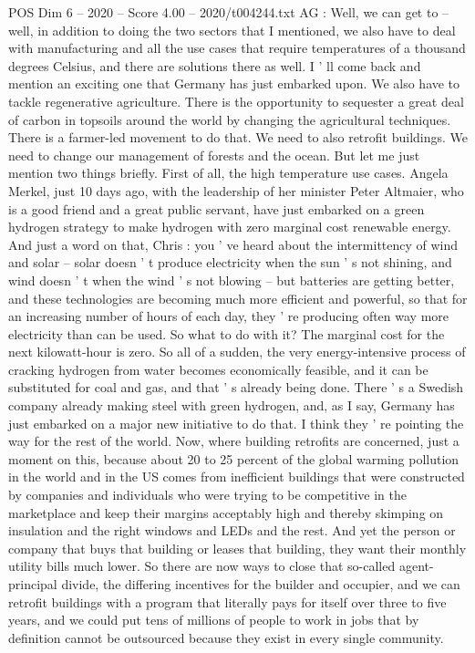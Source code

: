 \begin{textsample}{POS Dim 6 – 2020 – Score 4.00 – 2020/t004244.txt}
AG : Well, we can get to -- well, in addition to doing the two sectors that I mentioned, we also have to deal with manufacturing and all the use cases that require temperatures of a thousand degrees Celsius, and there are solutions there as well.
I ' ll come back and mention an exciting one that Germany has just embarked upon.
We also have to tackle regenerative agriculture.
There is the opportunity to sequester a great deal of carbon in topsoils around the world by changing the agricultural techniques.
There is a farmer-led movement to do that.
We need to also retrofit buildings.
We need to change our management of forests and the ocean.
But let me just mention two things briefly.
First of all, the high temperature use cases.
Angela Merkel, just 10 days ago, with the leadership of her minister Peter Altmaier, who is a good friend and a great public servant, have just embarked on a green hydrogen strategy to make hydrogen with zero marginal cost renewable energy.
And just a word on that, Chris : you ' ve heard about the intermittency of wind and solar -- solar doesn ' t produce electricity when the sun ' s not shining, and wind doesn ' t when the wind ' s not blowing -- but batteries are getting better, and these technologies are becoming much more efficient and powerful, so that for an increasing number of hours of each day, they ' re producing often way more electricity than can be used.
So what to do with it?
The marginal cost for the next kilowatt-hour is zero.
So all of a sudden, the very energy-intensive process of cracking hydrogen from water becomes economically feasible, and it can be substituted for coal and gas, and that ' s already being done.
There ' s a Swedish company already making steel with green hydrogen, and, as I say, Germany has just embarked on a major new initiative to do that.
I think they ' re pointing the way for the rest of the world.
Now, where building retrofits are concerned, just a moment on this, because about 20 to 25 percent of the global warming pollution in the world and in the US comes from inefficient buildings that were constructed by companies and individuals who were trying to be competitive in the marketplace and keep their margins acceptably high and thereby skimping on insulation and the right windows and LEDs and the rest.
And yet the person or company that buys that building or leases that building, they want their monthly utility bills much lower.
So there are now ways to close that so-called agent-principal divide, the differing incentives for the builder and occupier, and we can retrofit buildings with a program that literally pays for itself over three to five years, and we could put tens of millions of people to work in jobs that by definition cannot be outsourced because they exist in every single community.

\end{textsample}
